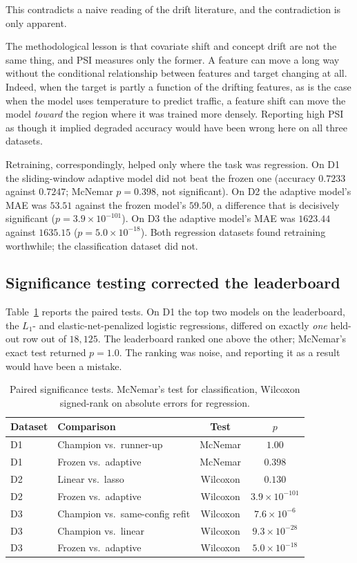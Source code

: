 \documentclass{ieeeaccess}
\begin{document}
This contradicts a naive reading of the drift literature, and the contradiction is only apparent.

The methodological lesson is that covariate shift and concept drift are not the same thing, and PSI measures only the former. A feature can move a long way without the conditional relationship between features and target changing at all. Indeed, when the target is partly a function of the drifting features, as is the case when the model uses temperature to predict traffic, a feature shift can move the model \emph{toward} the region where it was trained more densely. Reporting high PSI as though it implied degraded accuracy would have been wrong here on all three datasets.

Retraining, correspondingly, helped only where the task was regression. On D1 the sliding-window adaptive model did not beat the frozen one (accuracy $0.7233$ against $0.7247$; McNemar $p = 0.398$, not significant). On D2 the adaptive model's MAE was $53.51$ against the frozen model's $59.50$, a difference that is decisively significant ($p = 3.9 \times 10^{-101}$). On D3 the adaptive model's MAE was $1623.44$ against $1635.15$ ($p = 5.0 \times 10^{-18}$). Both regression datasets found retraining worthwhile; the classification dataset did not.

\subsection{Significance testing corrected the leaderboard}
Table~\ref{tab:significance} reports the paired tests. On D1 the top two models on the leaderboard, the $L_1$- and elastic-net-penalized logistic regressions, differed on exactly \emph{one} held-out row out of $18{,}125$. The leaderboard ranked one above the other; McNemar's exact test returned $p = 1.0$. The ranking was noise, and reporting it as a result would have been a mistake.

\begin{table}[t]
\caption{Paired significance tests. McNemar's test for classification, Wilcoxon signed-rank on absolute errors for regression.}
\label{tab:significance}
\centering
\footnotesize
\setlength{\tabcolsep}{3pt}
\begin{tabular}{llcc}
\toprule
Dataset & Comparison & Test & $p$ \\
\midrule
D1 & Champion vs.\ runner-up & McNemar & $1.00$ \\
D1 & Frozen vs.\ adaptive & McNemar & $0.398$ \\
D2 & Linear vs.\ lasso & Wilcoxon & $0.130$ \\
D2 & Frozen vs.\ adaptive & Wilcoxon & $3.9\times10^{-101}$ \\
D3 & Champion vs.\ same-config refit & Wilcoxon & $7.6\times10^{-6}$ \\
D3 & Champion vs.\ linear & Wilcoxon & $9.3\times10^{-28}$ \\
D3 & Frozen vs.\ adaptive & Wilcoxon & $5.0\times10^{-18}$ \\
\bottomrule
\end{tabular}
\end{table}
\end{document}
